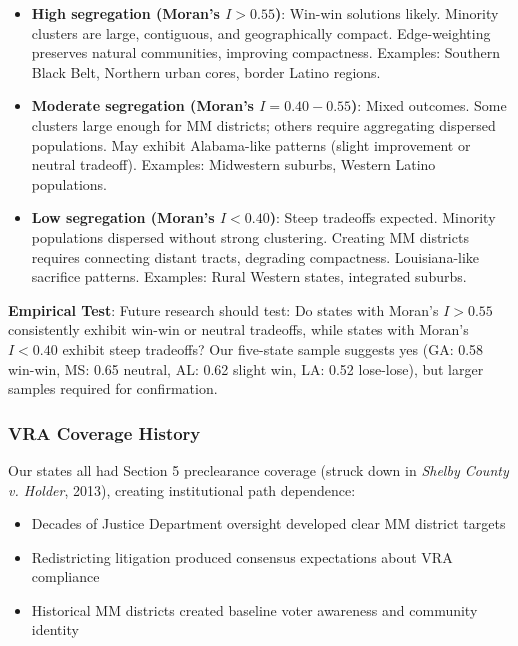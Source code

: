 \begin{itemize}
    \item \textbf{High segregation (Moran's $I > 0.55$)}: Win-win solutions likely. Minority clusters are large, contiguous, and geographically compact. Edge-weighting preserves natural communities, improving compactness. Examples: Southern Black Belt, Northern urban cores, border Latino regions.

    \item \textbf{Moderate segregation (Moran's $I = 0.40-0.55$)}: Mixed outcomes. Some clusters large enough for MM districts; others require aggregating dispersed populations. May exhibit Alabama-like patterns (slight improvement or neutral tradeoff). Examples: Midwestern suburbs, Western Latino populations.

    \item \textbf{Low segregation (Moran's $I < 0.40$)}: Steep tradeoffs expected. Minority populations dispersed without strong clustering. Creating MM districts requires connecting distant tracts, degrading compactness. Louisiana-like sacrifice patterns. Examples: Rural Western states, integrated suburbs.
\end{itemize}

\textbf{Empirical Test}: Future research should test: Do states with Moran's $I > 0.55$ consistently exhibit win-win or neutral tradeoffs, while states with Moran's $I < 0.40$ exhibit steep tradeoffs? Our five-state sample suggests yes (GA: 0.58 win-win, MS: 0.65 neutral, AL: 0.62 slight win, LA: 0.52 lose-lose), but larger samples required for confirmation.

\subsubsection{VRA Coverage History}

Our states all had Section 5 preclearance coverage (struck down in \emph{Shelby County v. Holder}, 2013), creating institutional path dependence:

\begin{itemize}
    \item Decades of Justice Department oversight developed clear MM district targets
    \item Redistricting litigation produced consensus expectations about VRA compliance
    \item Historical MM districts created baseline voter awareness and community identity
\end{itemize}

